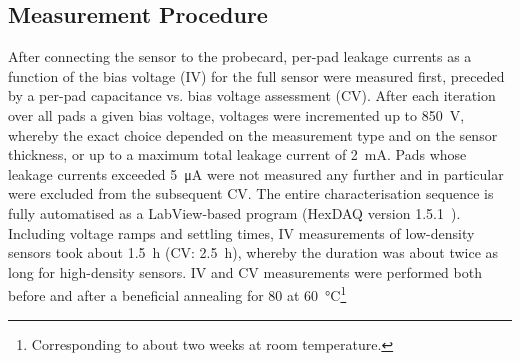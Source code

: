 \subsection{Measurement Procedure}
\label{subsec:setup_procedure}
After connecting the sensor to the probecard, per-pad leakage currents as a function of the bias voltage (IV) for the full sensor were measured first, preceded by a per-pad capacitance vs. bias voltage assessment (CV).
After each iteration over all pads a given bias voltage, voltages were incremented up to \SI{850}{\volt}, whereby the exact choice depended on the measurement type and on the sensor thickness, or up to a maximum total leakage current of \SI{2}{\milli\ampere}.  
Pads whose leakage currents exceeded \SI{5}{\micro\ampere} were not measured any further and in particular were excluded from the subsequent CV.
The entire characterisation sequence is fully automatised as a LabView-based program (HexDAQ version 1.5.1~\cite{labview_hexdaq}).
Including voltage ramps and settling times, IV measurements of low-density sensors took about \SI{1.5}{\hour} (CV: \SI{2.5}{\hour}), whereby the duration was about twice as long for high-density sensors.
IV and CV measurements were performed both before and after a beneficial annealing for \SI{80}{\min} at \SI{60}{\celsius}\footnote{Corresponding to about two weeks at room temperature.}